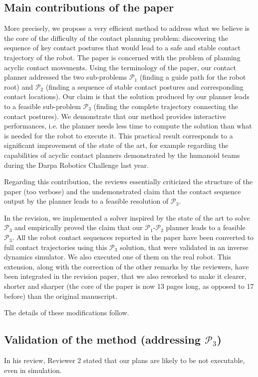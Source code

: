 \documentclass[a4paper]{article}
\begin{document}
\subsection{Main contributions of the paper}
More precisely, we propose a very efficient method to address what we believe is the core of the difficulty of the contact planning problem: discovering the sequence of key contact postures that would lead to a safe and stable contact trajectory of the robot. 
The paper is concerned with the problem of planning acyclic contact movements. 
Using the terminology of the paper, our contact planner addressed the two sub-problems $\mathcal{P}_1$ (finding a guide path for the robot root) and $\mathcal{P}_2$ (finding a sequence of stable contact postures and corresponding contact locations).
Our claim is that the solution produced by our planner leads to a feasible sub-problem $\mathcal{P}_3$ (finding the complete trajectory connecting the contact postures).
We demonstrate that our method provides interactive performances, i.e. the planner needs less time to compute the solution than what is needed for the robot to execute it.
This practical result corresponds to a significant improvement of the state of the art, for example regarding the capabilities of acyclic contact planners demonstrated by the humanoid teams during the Darpa Robotics Challenge last year.

Regarding this contribution, the reviews essentially criticized the structure of the paper (too verbose) and the undemonstrated claim that the contact sequence output by the planner leads to a feasible resolution of $\mathcal{P}_3$.

In the revision, we implemented a solver inspired by the state of the art to solve $\mathcal{P}_3$ and empirically proved the claim that our $\mathcal{P}_1$-$\mathcal{P}_2$ planner leads to a feasible $\mathcal{P}_3$. 
All the robot contact sequences reported in the paper have been converted to full contact trajectories using this $\mathcal{P}_3$ solution, that were validated in an inverse dynamics simulator.
We also executed one of them on the real robot.
This extension, along with the correction of the other remarks by the reviewers, have been integrated in the revision paper, that we also reworked to make it clearer, shorter and sharper (the core of the paper is now 13 pages long, as opposed to 17 before) than the original manuscript.

The details of these modifications follow.

\subsection{Validation of the method (addressing  $\mathcal{P}_3$) }
In his review, Reviewer 2 stated that our plans are likely to be not executable, even in simulation.
\end{document}
